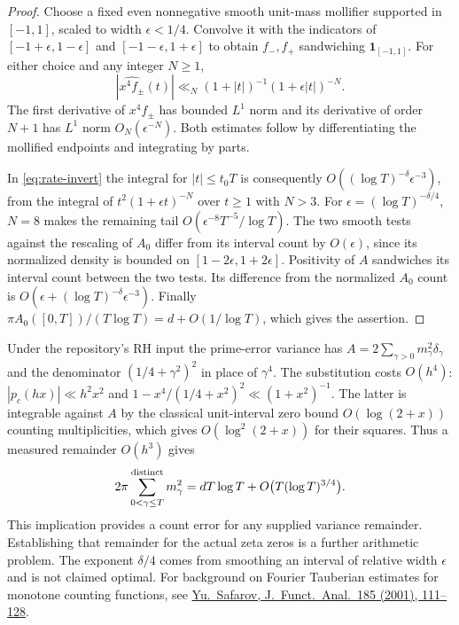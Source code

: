 \begin{proof}
Choose a fixed even nonnegative smooth unit-mass mollifier supported in
$[-1,1]$, scaled to width $\epsilon<1/4$. Convolve it with the indicators of
$[-1+\epsilon,1-\epsilon]$ and $[-1-\epsilon,1+\epsilon]$ to obtain $f_-,f_+$
sandwiching $\mathbf1_{[-1,1]}$. For either choice and any integer $N\ge1$,
\[
 |\widehat{x^4 f_\pm}(t)|\ll_N (1+|t|)^{-1}(1+\epsilon |t|)^{-N}.
\]
The first derivative of $x^4f_\pm$ has bounded $L^1$ norm and its derivative
of order $N+1$ has $L^1$ norm $O_N(\epsilon^{-N})$. Both estimates follow by
differentiating the mollified endpoints and integrating by parts.

In \eqref{eq:rate-invert} the integral for $|t|\le t_0T$ is consequently
$O((\log T)^{-\delta}\epsilon^{-3})$, from the integral of
$t^2(1+\epsilon t)^{-N}$ over $t\ge1$ with $N>3$. For
$\epsilon=(\log T)^{-\delta/4}$, $N=8$ makes the remaining tail
$O(\epsilon^{-8}T^{-5}/\log T)$.
The two smooth tests against the rescaling of $A_0$ differ from its
interval count by $O(\epsilon)$, since its normalized density is bounded
on $[1-2\epsilon,1+2\epsilon]$. Positivity of $A$ sandwiches its interval
count between the two tests. Its difference from the normalized $A_0$ count
is $O(\epsilon+(\log T)^{-\delta}\epsilon^{-3})$.
Finally $\pi A_0([0,T])/(T\log T)=d+O(1/\log T)$, which gives the assertion.
\end{proof}

Under the repository's RH input the prime-error variance has
$A=2\sum_{\gamma>0}m_\gamma^2\delta_\gamma$ and the denominator
$(1/4+\gamma^2)^2$ in place of $\gamma^4$. The substitution costs $O(h^4)$:
$|p_c(hx)|\ll h^2 x^2$ and
$1-x^4/(1/4+x^2)^2\ll(1+x^2)^{-1}$. The latter is integrable against
$A$ by the classical unit-interval zero bound $O(\log(2+x))$ counting
multiplicities, which gives $O(\log^2(2+x))$ for their squares. Thus a measured
remainder $O(h^3)$ gives
\[
 2\pi\sum_{0<\gamma\le T}^{\rm distinct}m_\gamma^2
   =dT\log T+O\bigl(T(\log T)^{3/4}\bigr).
\]
This implication provides a count error for any supplied variance remainder.
Establishing that remainder for the actual zeta zeros is a further arithmetic
problem. The exponent $\delta/4$ comes from smoothing an interval of relative
width $\epsilon$ and is not claimed optimal. For background on Fourier
Tauberian estimates for monotone counting functions, see
\href{https://doi.org/10.1006/jfan.2001.3764}{Yu.~Safarov, J.~Funct.\ Anal.\ 185
(2001), 111--128}.
